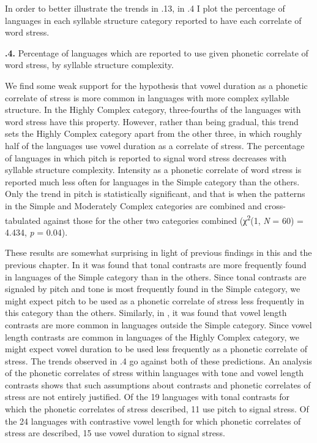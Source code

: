   In order to better illustrate the trends in .13, in .4 I plot the percentage of languages in each syllable structure category reported to have each correlate of word stress.





\textbf{.4.} Percentage of languages which are reported to use given phonetic correlate of word stress, by syllable structure complexity.



  We find some weak support for the hypothesis that vowel duration as a phonetic correlate of stress is more common in languages with more complex syllable structure. In the Highly Complex category, three-fourths of the languages with word stress have this property. However, rather than being gradual, this trend sets the Highly Complex category apart from the other three, in which roughly half of the languages use vowel duration as a correlate of stress. The percentage of languages in which pitch is reported to signal word stress decreases with syllable structure complexity. Intensity as a phonetic correlate of word stress is reported much less often for languages in the Simple category than the others. Only the trend in pitch is statistically significant, and that is when the patterns in the Simple and Moderately Complex categories are combined and cross-tabulated against those for the other two categories combined (χ\textsuperscript{2}(1, \textit{N} = 60) = 4.434, \textit{p} = 0.04).



  These results are somewhat surprising in light of previous findings in this and the previous chapter. In  it was found that tonal contrasts are more frequently found in languages of the Simple category than in the others. Since tonal contrasts are signaled by pitch and tone is most frequently found in the Simple category, we might expect pitch to be used as a phonetic correlate of stress less frequently in this category than the others. Similarly, in , it was found that vowel length contrasts are more common in languages outside the Simple category. Since vowel length contrasts are common in languages of the Highly Complex category, we might expect vowel duration to be used less frequently as a phonetic correlate of stress. The trends observed in .4 go against both of these predictions. An analysis of the phonetic correlates of stress within languages with tone and vowel length contrasts shows that such assumptions about contrasts and phonetic correlates of stress are not entirely justified. Of the 19 languages with tonal contrasts for which the phonetic correlates of stress described, 11 use pitch to signal stress. Of the 24 languages with contrastive vowel length for which phonetic correlates of stress are described, 15 use vowel duration to signal stress. 



